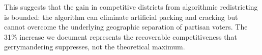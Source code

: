 This suggests that the gain in competitive districts from algorithmic
redistricting is bounded: the algorithm can eliminate artificial packing and
cracking but cannot overcome the underlying geographic separation of partisan
voters.  The 31\% increase we document represents the recoverable competitiveness
that gerrymandering suppresses, not the theoretical maximum.
